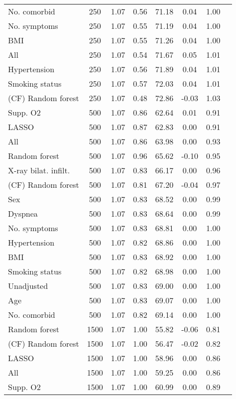 \documentclass{article}
\begin{document}
{\begin{longtable}{lccccccc}
No. comorbid & 250 & 1.07 & 0.56 & 71.18 &  0.04 & 1.00 \\ 
No. symptoms & 250 & 1.07 & 0.55 & 71.19 &  0.04 & 1.00 \\ 
BMI & 250 & 1.07 & 0.55 & 71.26 &  0.04 & 1.00 \\ 
All & 250 & 1.07 & 0.54 & 71.67 &  0.05 & 1.01 \\ 
Hypertension & 250 & 1.07 & 0.56 & 71.89 &  0.04 & 1.01 \\ 
Smoking status & 250 & 1.07 & 0.57 & 72.03 &  0.04 & 1.01 \\ 
(CF) Random forest & 250 & 1.07 & 0.48 & 72.86 & -0.03 & 1.03 \\ \midrule() 
Supp. O2 & 500 & 1.07 & 0.86 & 62.64 &  0.01 & 0.91 \\ 
LASSO & 500 & 1.07 & 0.87 & 62.83 &  0.00 & 0.91 \\ 
All & 500 & 1.07 & 0.86 & 63.98 &  0.00 & 0.93 \\ 
Random forest & 500 & 1.07 & 0.96 & 65.62 & -0.10 & 0.95 \\ 
X-ray bilat. infilt. & 500 & 1.07 & 0.83 & 66.17 &  0.00 & 0.96 \\ 
(CF) Random forest & 500 & 1.07 & 0.81 & 67.20 & -0.04 & 0.97 \\ 
Sex & 500 & 1.07 & 0.83 & 68.52 &  0.00 & 0.99 \\ 
Dyspnea & 500 & 1.07 & 0.83 & 68.64 &  0.00 & 0.99 \\ 
No. symptoms & 500 & 1.07 & 0.83 & 68.81 &  0.00 & 1.00 \\ 
Hypertension & 500 & 1.07 & 0.82 & 68.86 &  0.00 & 1.00 \\ 
BMI & 500 & 1.07 & 0.83 & 68.92 &  0.00 & 1.00 \\ 
Smoking status & 500 & 1.07 & 0.82 & 68.98 &  0.00 & 1.00 \\ 
Unadjusted & 500 & 1.07 & 0.83 & 69.00 &  0.00 & 1.00 \\ 
Age & 500 & 1.07 & 0.83 & 69.07 &  0.00 & 1.00 \\ 
No. comorbid & 500 & 1.07 & 0.82 & 69.14 &  0.00 & 1.00 \\ \midrule() 
Random forest & 1500 & 1.07 & 1.00 & 55.82 & -0.06 & 0.81 \\ 
(CF) Random forest & 1500 & 1.07 & 1.00 & 56.47 & -0.02 & 0.82 \\ 
LASSO & 1500 & 1.07 & 1.00 & 58.96 &  0.00 & 0.86 \\ 
All & 1500 & 1.07 & 1.00 & 59.25 &  0.00 & 0.86 \\ 
Supp. O2 & 1500 & 1.07 & 1.00 & 60.99 &  0.00 & 0.89 \\ 

\end{longtable}}
\end{document}
